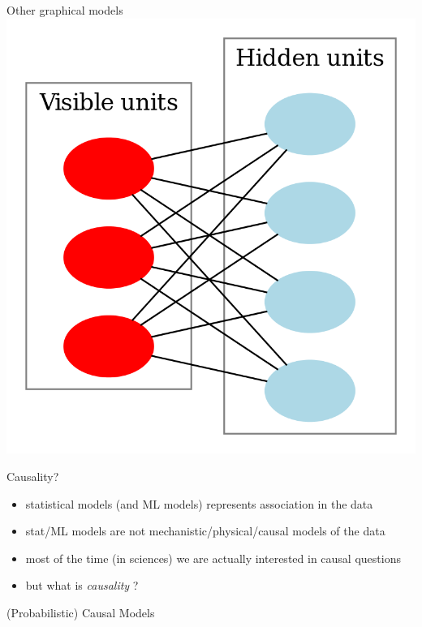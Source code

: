 \documentclass{beamer}
\begin{document}
\begin{frame}{Other graphical models}
	\includegraphics[scale=0.1]{images/restricted}
\end{frame}

\begin{frame}{Causality?} 
	\begin{itemize}
		\item<1-> statistical models (and ML models) represents association in the data 
		\item<2-> stat/ML models are not mechanistic/physical/causal models of the data 
		\item<3-> most of the time (in sciences) we are actually interested in causal questions
		\item<4-> but what is \emph{causality} ? 
	\end{itemize}

\end{frame}



\begin{frame}{(Probabilistic) Causal Models}

\end{frame}



\begin{frame}

\end{frame}
\end{document}
